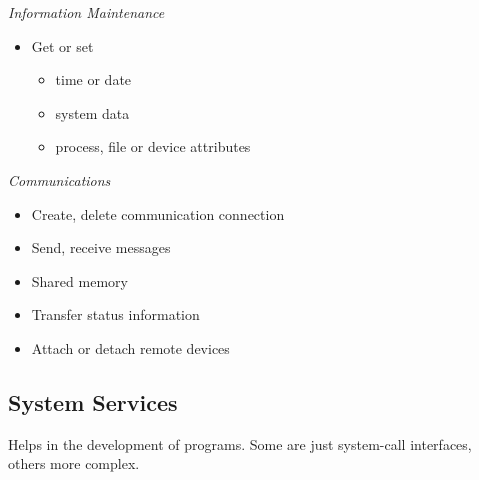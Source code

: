 \documentclass[]{article}
\begin{document}
\emph{Information Maintenance}
\begin{itemize}
    \item Get or set 
    \begin{itemize}
        \item time or date
        \item system data
        \item process, file or device attributes
    \end{itemize}
\end{itemize}

\emph{Communications}
\begin{itemize}
    \item Create, delete communication connection
    \item Send, receive messages
    \item Shared memory
    \item Transfer status information
    \item Attach or detach remote devices
\end{itemize}

\subsection{System Services}

Helps in the development of programs. Some are just system-call interfaces, others more complex.
\end{document}
